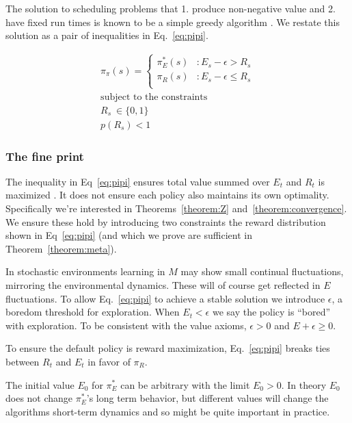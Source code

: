 \documentclass[10pt,letterpaper]{article}
\begin{document}
The solution to scheduling problems that 1. produce non-negative value and 2. have fixed run times is known to be a simple greedy algorithm \cite{Roughgarden2019}. We restate this solution as a pair of inequalities in Eq.~\ref{eq:pipi}. 

\begin{equation} 
    \label{eq:pipi}
    \begin{split}
        \pi_{\pi}(s) = 
        \begin{cases}
            \pi^*_E(s) & : E_s - \epsilon > R_s \\
            \pi_R(s) & : E_s - \epsilon \le R_s \\
        \end{cases}\\
        \text{subject to the constraints}\\
        R_s \ \in \{0, 1 \}\\
        p(R_s) < 1
    \end{split}
\end{equation}

\subsubsection{The fine print}
The inequality in Eq~\ref{eq:pipi} ensures total value summed over $E_t$ and $R_t$ is maximized \cite{Roughgarden2019}. It does not ensure each policy also maintains its own optimality. Specifically we're interested in  Theorems~\ref{theorem:Z} and~\ref{theorem:convergence}. We ensure these hold by introducing two constraints the reward distribution shown in Eq~\ref{eq:pipi} (and which we prove are sufficient in Theorem~\ref{theorem:meta}).

In stochastic environments learning in $M$ may show small continual fluctuations, mirroring the environmental dynamics. These will of course get reflected in $E$ fluctuations. To allow Eq.~\ref{eq:pipi} to achieve a stable solution we introduce $\epsilon$, a boredom threshold for exploration. When $E_t < \epsilon$ we say the policy is ``bored'' with exploration. To be consistent with the value axioms, $\epsilon > 0$ and $E + \epsilon \geq 0$. 

To ensure the default policy is reward maximization, Eq.~\ref{eq:pipi} breaks ties between $R_t$ and $E_t$ in favor of $\pi_R$.

The initial value $E_0$ for $\pi^*_E$ can be arbitrary with the limit $E_0 > 0$. In theory $E_0$ does not change $\pi^*_E$'s long term behavior, but different values will change the algorithms short-term dynamics and so might be quite important in practice. 
\end{document}
